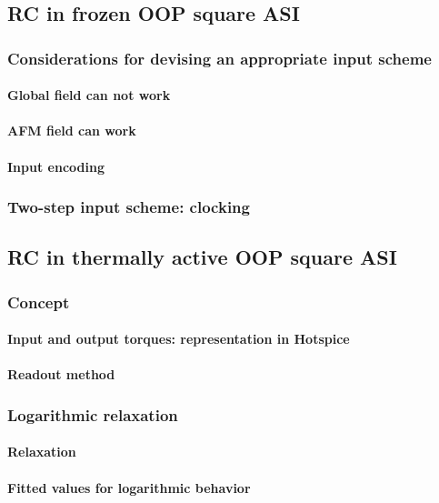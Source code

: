 \subsection{RC in frozen OOP square ASI}
\subsubsection{Considerations for devising an appropriate input scheme}
\paragraph{Global field can not work} %
\paragraph{AFM field can work}
\paragraph{Input encoding} %
\subsubsection{Two-step input scheme: clocking} %

\subsection{RC in thermally active OOP square ASI}
\subsubsection{Concept} %
\paragraph{Input and output torques: representation in Hotspice}
\paragraph{Readout method}
\subsubsection{Logarithmic relaxation}
\paragraph{Relaxation}
\paragraph{Fitted values for logarithmic behavior}
